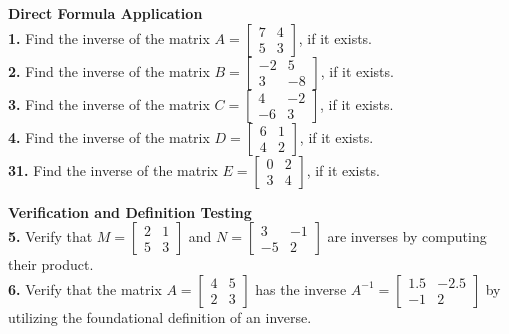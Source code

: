 \documentclass{article}
\begin{document}
\textbf{Direct Formula Application} \\
\textbf{1.} Find the inverse of the matrix $A = \begin{bmatrix} 7 & 4 \\ 5 & 3 \end{bmatrix}$, if it exists. \\
\textbf{2.} Find the inverse of the matrix $B = \begin{bmatrix} -2 & 5 \\ 3 & -8 \end{bmatrix}$, if it exists. \\
\textbf{3.} Find the inverse of the matrix $C = \begin{bmatrix} 4 & -2 \\ -6 & 3 \end{bmatrix}$, if it exists. \\
\textbf{4.} Find the inverse of the matrix $D = \begin{bmatrix} 6 & 1 \\ 4 & 2 \end{bmatrix}$, if it exists. \\
\textbf{31.} Find the inverse of the matrix $E = \begin{bmatrix} 0 & 2 \\ 3 & 4 \end{bmatrix}$, if it exists.

\vspace{10pt}
\noindent
\textbf{Verification and Definition Testing} \\
\textbf{5.} Verify that $M = \begin{bmatrix} 2 & 1 \\ 5 & 3 \end{bmatrix}$ and $N = \begin{bmatrix} 3 & -1 \\ -5 & 2 \end{bmatrix}$ are inverses by computing their product. \\
\textbf{6.} Verify that the matrix $A = \begin{bmatrix} 4 & 5 \\ 2 & 3 \end{bmatrix}$ has the inverse $A^{-1} = \begin{bmatrix} 1.5 & -2.5 \\ -1 & 2 \end{bmatrix}$ by utilizing the foundational definition of an inverse.
\end{document}
